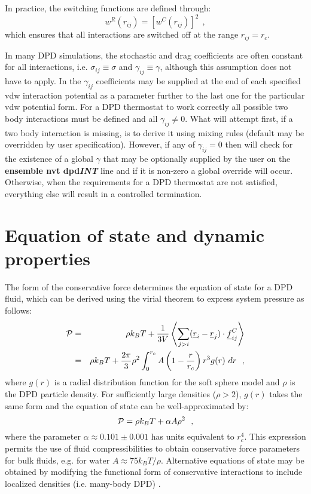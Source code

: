 In practice, the switching functions are defined through:
\begin{equation}
w^{R}(r_{ij}) = \left[w^{C}(r_{ij})\right]^{2}~~,
\end{equation}
which ensures that all interactions are switched off at the range $r_{ij} = r_{c}$.

In many DPD simulations, the stochastic and drag coefficients are often constant
for all interactions, i.e. $\sigma_{ij} \equiv \sigma$ and $\gamma_{ij} \equiv \gamma$,
although this assumption does not have to apply.  In \D the $\gamma_{ij}$ coefficients
may be supplied at the end of each specified vdw interaction potential as a parameter
further to the last one for the particular vdw potential form.  For a DPD thermostat to
work correctly all possible two body interactions must be defined and all $\gamma_{ij} \ne 0$.
What \D will attempt first, if a two body interaction is missing, is to derive it using
mixing rules (default may be overridden by user specification).  However, if any of
$\gamma_{ij} = 0$ then \D will check for the existence of a global $\gamma$ that may be
optionally supplied by the user on the {\bf ensemble nvt dpd}\textrm{\textit{\textbf{INT}}}
line and if it is non-zero a global override will occur.  Otherwise, when the requirements
for a DPD thermostat are not satisfied, everything else will result in a controlled termination.

\section{Equation of state and dynamic properties}

The form of the conservative force determines the equation of state for a DPD fluid,
which can be derived using the virial theorem to express system pressure as follows:
\begin{eqnarray}
{\cal P} &=& \rho k_{B}T + \frac{1}{3V} \left\langle \sum_{j>i} (\mbox{$\underline{r}$}_i-\mbox{$\underline{r}$}_j) \cdot \mbox{$\underline{f}$}_{ij}^{C} \right\rangle \\
  &=& \rho k_{B} T + \frac{2 \pi}{3} \rho^{2} \int_{0}^{r_{c}} A \left( 1 - \frac{r}{r_{c}} \right) r^{3} g(r)~dr~~,
\end{eqnarray}
where $g(r)$ is a radial distribution function for the soft sphere model \cite{groot-97a}
and $\rho$ is the DPD particle density.  For sufficiently large densities ($\rho > 2$),
$g(r)$ takes the same form and the equation of state can be well-approximated by:
\begin{equation}
{\cal P} = \rho k_{B}T + \alpha A \rho^{2}~~,
\end{equation}
where the parameter $\alpha \approx 0.101 \pm 0.001$ has units equivalent to $r_{c}^{4}$.
This expression permits the use of fluid compressibilities to obtain conservative force
parameters for bulk fluids, e.g. for water $A \approx 75 k_{B} T/\rho$.  Alternative
equations of state may be obtained by modifying the functional form of conservative
interactions to include localized densities (i.e. many-body DPD) \cite{pagonabarraga-01a,trofimov-02a}.

